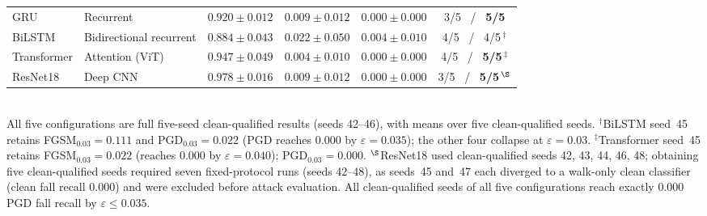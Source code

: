 \begin{table}[t]
\begin{tabular}{l l c c c c}
    GRU         & Recurrent               & $0.920 \pm 0.012$ & $0.009 \pm 0.012$ & $\mathbf{0.000 \pm 0.000}$ & 3/5 \ / \ \textbf{5/5} \\
    BiLSTM      & Bidirectional recurrent & $0.884 \pm 0.043$ & $0.022 \pm 0.050$ & $0.004 \pm 0.010$         & 4/5 \ / \ 4/5\,$^{\dagger}$ \\
    Transformer & Attention (ViT)         & $0.947 \pm 0.049$ & $0.004 \pm 0.010$ & $\mathbf{0.000 \pm 0.000}$ & 4/5 \ / \ \textbf{5/5}\,$^{\ddagger}$ \\
    ResNet18    & Deep CNN                & $0.978 \pm 0.016$ & $0.009 \pm 0.012$ & $\mathbf{0.000 \pm 0.000}$ & 3/5 \ / \ \textbf{5/5}\,$^{\S}$ \\
    \bottomrule
  \end{tabular}
  \\[0.3em]
  {\footnotesize All five configurations are full five-seed clean-qualified results
  (seeds 42--46), with means over five clean-qualified seeds. $^{\dagger}$BiLSTM
  seed~45 retains FGSM$_{0.03}{=}0.111$ and PGD$_{0.03}{=}0.022$ (PGD reaches
  $0.000$ by $\varepsilon{=}0.035$); the other four collapse at $\varepsilon=0.03$.
  $^{\ddagger}$Transformer seed~45 retains FGSM$_{0.03}{=}0.022$ (reaches $0.000$ by
  $\varepsilon{=}0.040$); PGD$_{0.03}{=}0.000$. $^{\S}$ResNet18 used clean-qualified
  seeds 42, 43, 44, 46, 48; obtaining five clean-qualified seeds required seven
  fixed-protocol runs (seeds 42--48), as seeds~45 and~47 each diverged to a
  walk-only clean classifier (clean fall recall $0.000$) and were excluded before
  attack evaluation. All clean-qualified seeds of all five configurations reach
  exactly $0.000$ PGD fall recall by $\varepsilon\le0.035$.}
\end{table}
